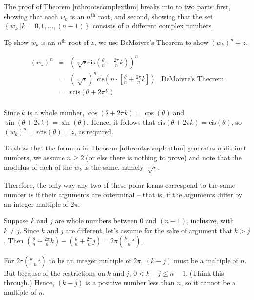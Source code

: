\documentclass{ximera}
\begin{document}
The proof of Theorem \ref{nthrootscomplexthm} breaks into to two parts:  first, showing that each $w_k$ is an $n^{\text{th}}$ root, and second, showing that the set  $\left\{ w_k \, | \, k = 0, 1, \ldots, (n-1)\right\}$ consists of $n$ different  complex numbers. 

 

 To show $w_k$ is an  $n^{\text{th}}$ root of $z$, we use DeMoivre's Theorem to show $\left(w_k\right)^n = z$.

\[ \begin{array}{rcll}
\left(w_k\right)^n & = & \left(\sqrt[n]{r}\text{cis}\left(\frac{\theta}{n} + \frac{2\pi}{n} k \right)\right)^n & \\
	 & = & \left(\sqrt[n]{r}\right)^{n} \text{cis}\left( n \cdot \left[\frac{\theta}{n} + \frac{2\pi}{n} k \right] \right) & \text{DeMoivre's Theorem}\\
& = & r \text{cis}\left(\theta + 2\pi k\right) & \\ \end{array} \]
																	 
Since $k$ is a whole number, $\cos(\theta + 2\pi k) = \cos(\theta)$ and $\sin(\theta + 2\pi k) = \sin(\theta)$. Hence, it follows that $\text{cis}(\theta + 2\pi k) = \text{cis}(\theta)$, so $\left(w_k\right)^n = r \text{cis}(\theta) = z$, as required.  

 

To show that the formula in Theorem  \ref{nthrootscomplexthm} generates $n$ distinct numbers, we assume $n \geq 2$ (or else there is nothing to prove) and note that the modulus of each of the  $w_k$  is the same, namely $\sqrt[n]{r}$.  

 

Therefore, the only way any two of these polar forms correspond to  the same number is if their arguments are coterminal -- that is, if the arguments differ by an integer multiple of $2\pi$. 

 

Suppose $k$ and $j$ are whole numbers between $0$ and $(n-1)$, inclusive,  with $k \neq j$.  Since $k$ and $j$ are different, let's assume for the sake of argument that  $k > j$.  Then $\left( \frac{\theta}{n} + \frac{2\pi}{n} k \right)  - \left( \frac{\theta}{n} + \frac{2\pi}{n} j \right) = 2\pi \left(\frac{k-j}{n}\right)$. 

 

For $2\pi \left(\frac{k-j}{n}\right)$ to be an integer multiple of $2\pi$, $(k-j)$ must be a multiple of $n$.  But because of the restrictions on $k$ and $j$, $0 < k - j \leq n-1$. (Think this through.)  Hence, $(k-j)$ is a positive number less  than $n$, so it cannot be a multiple of $n$.  
\end{document}
